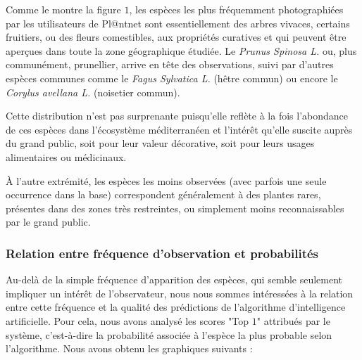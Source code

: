\documentclass[a4paper,12pt]{article}
\begin{document}
Comme le montre la figure $1$, les espèces les plus fréquemment photographiées par les utilisateurs de Pl@ntnet sont essentiellement des arbres vivaces, certains fruitiers, ou des fleurs comestibles, aux propriétés curatives et qui peuvent être aperçues dans toute la zone géographique étudiée. Le \textit{Prunus Spinosa L.} ou, plus communément, prunellier, arrive en tête des observations, suivi par d'autres espèces communes comme le \textit{Fagus Sylvatica L.} (hêtre commun) ou encore le \textit{Corylus avellana L.} (noisetier commun).

\vspace{0.2cm}

Cette distribution n'est pas surprenante puisqu'elle reflète à la fois l'abondance de ces espèces dans l'écosystème méditerranéen et l'intérêt qu'elle suscite auprès du grand public, soit pour leur valeur décorative, soit pour leurs usages alimentaires ou médicinaux.

\vspace{0.2cm}

À l'autre extrémité, les espèces les moins observées (avec parfois une seule occurrence dans la base) correspondent généralement à des plantes rares, présentes dans des zones très restreintes, ou simplement moins reconnaissables par le grand public.

\subsubsection{Relation entre fréquence d'observation et probabilités}

Au-delà de la simple fréquence d'apparition des espèces, qui semble seulement impliquer un intérêt de l'observateur, nous nous sommes intéressées à la relation entre cette fréquence et la qualité des prédictions de l'algorithme d'intelligence artificielle. Pour cela, nous avons analysé les scores "Top $1$" attribués par le système, c'est-à-dire la probabilité associée à l'espèce la plus probable selon l'algorithme. Nous avons obtenu les graphiques suivants :
\end{document}
